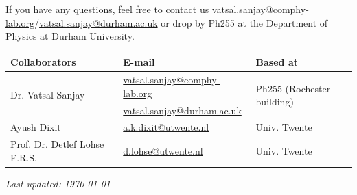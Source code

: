 \documentclass[11pt]{article}
\begin{document}
If you have any questions, feel free to contact us \href{mailto:vatsal.sanjay@comphy-lab.org}{vatsal.sanjay@comphy-lab.org}/\href{mailto:vatsal.sanjay@durham.ac.uk}{vatsal.sanjay@durham.ac.uk} or drop by Ph255 at the Department of Physics at Durham University.
\begin{center}
\begin{tabular}{|l|l|l|}
\hline \textbf{Collaborators} & \textbf{E-mail} & \textbf{Based at} \\
\hline \multirow{2}{*}{Dr. Vatsal Sanjay} & \href{mailto:vatsal.sanjay@comphy-lab.org}{vatsal.sanjay@comphy-lab.org} & \multirow{2}{*}{Ph255 (Rochester building)} \\
& \href{mailto:vatsal.sanjay@durham.ac.uk}{vatsal.sanjay@durham.ac.uk} & \\
\hline Ayush Dixit & \href{mailto:a.k.dixit@utwente.nl}{a.k.dixit@utwente.nl} & Univ. Twente \\
\hline Prof. Dr. Detlef Lohse F.R.S. & \href{mailto:d.lohse@utwente.nl}{d.lohse@utwente.nl} & Univ. Twente  \\
\hline
\end{tabular}
\end{center}

\vspace{1em}
\noindent\textit{Last updated: \today}

\printbibliography
\end{document}
